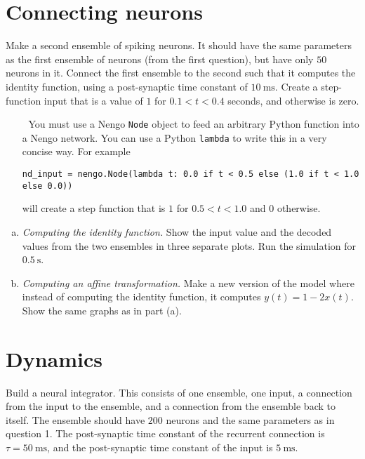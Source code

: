 	\section{Connecting neurons}
	
	Make a second ensemble of spiking neurons. It should have the same parameters as the first ensemble of neurons (from the first question), but have only $50$ neurons in it. Connect the first ensemble to the second such that it computes the identity function, using a post-synaptic time constant of $\SI{10}{\milli\second}$. Create a step-function input that is a value of $1$ for $0.1<t<0.4$ seconds, and otherwise is zero.

	\begin{itemize}
		\item[{\symbolfont 🐍}] You must use a Nengo \texttt{Node} object to feed an arbitrary Python function into a Nengo network. You can use a Python \texttt{lambda} to write this in a very concise way. For example
		\begin{verbatim}
nd_input = nengo.Node(lambda t: 0.0 if t < 0.5 else (1.0 if t < 1.0 else 0.0))
		\end{verbatim}
		will create a step function that is $1$ for $0.5<t<1.0$ and $0$ otherwise.
	\end{itemize}

	\begin{enumerate}[a)]
		\item {} \emph{Computing the identity function.} Show the input value and the decoded values from the two  ensembles in three separate plots. Run the simulation for $\SI{0.5}{\second}$.
		\item {} \emph{Computing an affine transformation.} Make a new version of the model where instead of computing the identity function, it computes $y(t) = 1 - 2x(t)$. Show the same graphs as in part (a).
	\end{enumerate}


	\section{Dynamics}
	
	Build a neural integrator. This consists of one ensemble, one input, a connection from the input to the ensemble, and a connection from the ensemble back to itself. The ensemble should have $200$ neurons and the same parameters as in question 1. The post-synaptic time constant of the recurrent connection is $\tau = \SI{50}{\milli\second}$, and the post-synaptic time constant of the input is $\SI{5}{\milli\second}$.
	
